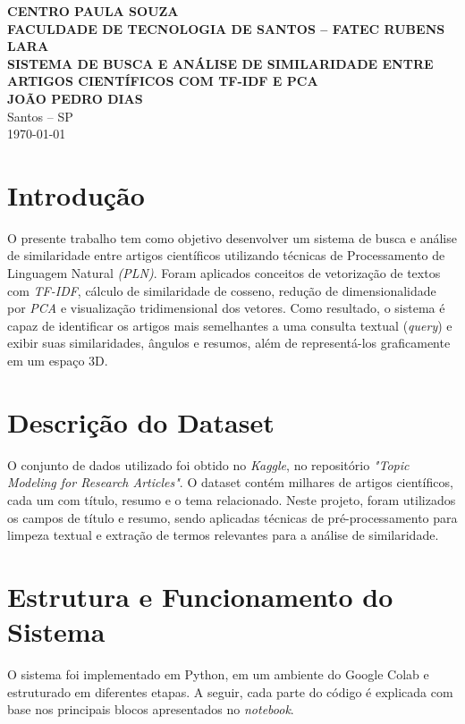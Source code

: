 \documentclass[12pt,a4paper]{article}
\begin{document}
\begin{titlepage}
    \centering
    {\large \textbf{CENTRO PAULA SOUZA}}\\
    {\large \textbf{FACULDADE DE TECNOLOGIA DE SANTOS – FATEC RUBENS LARA}}\\[4cm]

    {\bfseries\LARGE SISTEMA DE BUSCA E ANÁLISE DE SIMILARIDADE ENTRE ARTIGOS CIENTÍFICOS COM TF-IDF E PCA}\\[3cm]

    {\large \textbf{JOÃO PEDRO DIAS}}\\[4cm]

    {\large Santos – SP}\\
    {\large \today}
\end{titlepage}

\renewcommand{\contentsname}{Sumário}
\tableofcontents
\newpage

\section*{Introdução}
O presente trabalho tem como objetivo desenvolver um sistema de busca e análise de similaridade entre artigos científicos utilizando técnicas de Processamento de Linguagem Natural \textit{(PLN)}. Foram aplicados conceitos de vetorização de textos com \textit{TF-IDF}, cálculo de similaridade de cosseno, redução de dimensionalidade por \textit{PCA} e visualização tridimensional dos vetores. Como resultado, o sistema é capaz de identificar os artigos mais semelhantes a uma consulta textual (\textit{query}) e exibir suas similaridades, ângulos e resumos, além de representá-los graficamente em um espaço 3D.

\section{Descrição do Dataset}
O conjunto de dados utilizado foi obtido no \textit{Kaggle}, no repositório \textit{"Topic Modeling for Research Articles"}. O dataset contém milhares de artigos científicos, cada um com título, resumo e o tema relacionado. Neste projeto, foram utilizados os campos de título e resumo, sendo aplicadas técnicas de pré-processamento para limpeza textual e extração de termos relevantes para a análise de similaridade.

\section{Estrutura e Funcionamento do Sistema}
O sistema foi implementado em Python, em um ambiente do Google Colab e estruturado em diferentes etapas. A seguir, cada parte do código é explicada com base nos principais blocos apresentados no \textit{notebook}.
\end{document}
